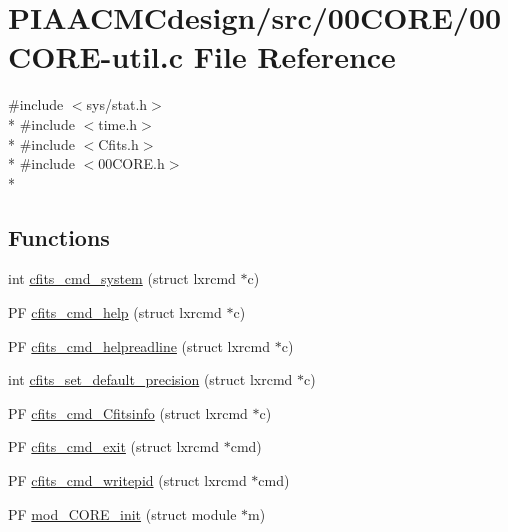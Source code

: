 \hypertarget{PIAACMCdesign_2src_200CORE_200CORE-util_8c}{\section{P\+I\+A\+A\+C\+M\+Cdesign/src/00\+C\+O\+R\+E/00\+C\+O\+R\+E-\/util.c File Reference}
\label{PIAACMCdesign_2src_200CORE_200CORE-util_8c}
}
{\ttfamily \#include $<$sys/stat.\+h$>$}\\*
{\ttfamily \#include $<$time.\+h$>$}\\*
{\ttfamily \#include $<$Cfits.\+h$>$}\\*
{\ttfamily \#include $<$00\+C\+O\+R\+E.\+h$>$}\\*
\subsection*{Functions}
\begin{DoxyCompactItemize}
\item 
int \hyperlink{PIAACMCdesign_2src_200CORE_200CORE-util_8c_a5c347013d2321007a39b35479a004a98}{cfits\+\_\+cmd\+\_\+system} (struct lxrcmd $\ast$c)
\item 
P\+F \hyperlink{PIAACMCdesign_2src_200CORE_200CORE-util_8c_adcad0b09bdc39ca886929037370e91e3}{cfits\+\_\+cmd\+\_\+help} (struct lxrcmd $\ast$c)
\item 
P\+F \hyperlink{PIAACMCdesign_2src_200CORE_200CORE-util_8c_aae63cebb1c60093a659435e992688824}{cfits\+\_\+cmd\+\_\+helpreadline} (struct lxrcmd $\ast$c)
\item 
int \hyperlink{PIAACMCdesign_2src_200CORE_200CORE-util_8c_af99a7b6fc82ebc9772ed71420e79e4ba}{cfits\+\_\+set\+\_\+default\+\_\+precision} (struct lxrcmd $\ast$c)
\item 
P\+F \hyperlink{PIAACMCdesign_2src_200CORE_200CORE-util_8c_a9f914b00beb9aca409d72a7e61b35cd8}{cfits\+\_\+cmd\+\_\+\+Cfitsinfo} (struct lxrcmd $\ast$c)
\item 
P\+F \hyperlink{PIAACMCdesign_2src_200CORE_200CORE-util_8c_a71ac14b0fd01ac9ec195dfaf9770051f}{cfits\+\_\+cmd\+\_\+exit} (struct lxrcmd $\ast$cmd)
\item 
P\+F \hyperlink{PIAACMCdesign_2src_200CORE_200CORE-util_8c_a73a58102b0bf4d2351ab96a614a25e87}{cfits\+\_\+cmd\+\_\+writepid} (struct lxrcmd $\ast$cmd)
\item 
P\+F \hyperlink{PIAACMCdesign_2src_200CORE_200CORE-util_8c_a41cdcd744da71a393cd0174d3554213b}{mod\+\_\+C\+O\+R\+E\+\_\+init} (struct module $\ast$m)
\end{DoxyCompactItemize}
